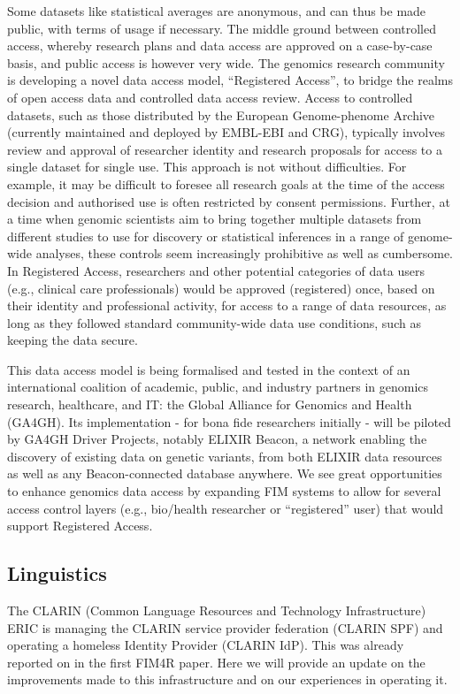 \documentclass[fleqn,10pt]{wlscirep}
\begin{document}
{Some datasets like statistical averages are anonymous, and can thus be made public, with terms of usage if necessary. The middle ground between controlled access, whereby research plans and data access are approved on a case-by-case basis, and public access is however very wide. The genomics research community is developing a novel data access model, “Registered Access”, to bridge the realms of open access data and controlled data access review\cite{dyke}. Access to controlled datasets, such as those distributed by the European Genome-phenome Archive (currently maintained and deployed by EMBL-EBI and CRG), typically involves review and approval of researcher identity and research proposals for access to a single dataset for single use. This approach is not without difficulties. For example, it may be difficult to foresee all research goals at the time of the access decision and authorised use is often restricted by consent permissions. Further, at a time when genomic scientists aim to bring together multiple datasets from different studies to use for discovery or statistical inferences in a range of genome-wide analyses, these controls seem increasingly prohibitive as well as cumbersome. In Registered Access, researchers and other potential categories of data users (e.g., clinical care professionals) would be approved (registered) once, based on their identity and professional activity, for access to a range of data resources, as long as they followed standard community-wide data use conditions, such as keeping the data secure.

This data access model is being formalised and tested in the context of an international coalition of academic, public, and industry partners in genomics research, healthcare, and IT: the Global Alliance for Genomics and Health (GA4GH)\cite{ga4gh}. Its implementation - for bona fide researchers initially - will be piloted by GA4GH Driver Projects, notably ELIXIR Beacon, a network enabling the discovery of existing data on genetic variants, from both ELIXIR data resources as well as any Beacon-connected database anywhere. We see great opportunities to enhance genomics data access by expanding FIM systems to allow for several access control layers (e.g., bio/health researcher or “registered” user) that would support Registered Access.

\subsection{Linguistics}
The CLARIN (Common Language Resources and Technology Infrastructure) ERIC is managing the CLARIN service provider federation (CLARIN SPF) and operating a homeless Identity Provider (CLARIN IdP). This was already reported on in the first FIM4R paper. Here we will provide an update on the improvements made to this infrastructure and on our experiences in operating it.

}
\end{document}

